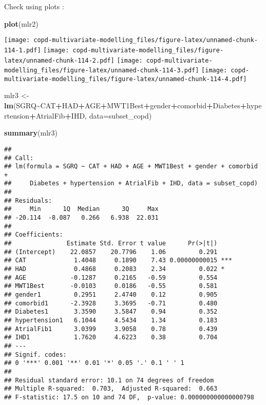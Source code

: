 \documentclass[
]{article}
\newenvironment{Shaded}{\begin{snugshade}}{\end{snugshade}}
\newcommand{\AttributeTok}[1]{\textcolor[rgb]{0.13,0.29,0.53}{#1}}
\newcommand{\FunctionTok}[1]{\textcolor[rgb]{0.13,0.29,0.53}{\textbf{#1}}}
\newcommand{\NormalTok}[1]{#1}
\newcommand{\OtherTok}[1]{\textcolor[rgb]{0.56,0.35,0.01}{#1}}
\newcommand{\SpecialCharTok}[1]{\textcolor[rgb]{0.81,0.36,0.00}{\textbf{#1}}}
\begin{document}
Check using plots :

\begin{Shaded}
\begin{Highlighting}[]
\FunctionTok{plot}\NormalTok{(mlr2)}
\end{Highlighting}
\end{Shaded}

\texttt{[image: copd-multivariate-modelling\_files/figure-latex/unnamed-chunk-114-1.pdf]}
\texttt{[image: copd-multivariate-modelling\_files/figure-latex/unnamed-chunk-114-2.pdf]}
\texttt{[image: copd-multivariate-modelling\_files/figure-latex/unnamed-chunk-114-3.pdf]}
\texttt{[image: copd-multivariate-modelling\_files/figure-latex/unnamed-chunk-114-4.pdf]}

\begin{Shaded}
\begin{Highlighting}[]
\NormalTok{mlr3 }\OtherTok{\textless{}{-}} \FunctionTok{lm}\NormalTok{(SGRQ}\SpecialCharTok{\textasciitilde{}}\NormalTok{CAT}\SpecialCharTok{+}\NormalTok{HAD}\SpecialCharTok{+}\NormalTok{AGE}\SpecialCharTok{+}\NormalTok{MWT1Best}\SpecialCharTok{+}\NormalTok{gender}\SpecialCharTok{+}\NormalTok{comorbid}\SpecialCharTok{+}\NormalTok{Diabetes}\SpecialCharTok{+}\NormalTok{hypertension}\SpecialCharTok{+}\NormalTok{AtrialFib}\SpecialCharTok{+}\NormalTok{IHD, }\AttributeTok{data=}\NormalTok{subset\_copd)}
\end{Highlighting}
\end{Shaded}

\begin{Shaded}
\begin{Highlighting}[]
\FunctionTok{summary}\NormalTok{(mlr3)}
\end{Highlighting}
\end{Shaded}

\begin{verbatim}
## 
## Call:
## lm(formula = SGRQ ~ CAT + HAD + AGE + MWT1Best + gender + comorbid + 
##     Diabetes + hypertension + AtrialFib + IHD, data = subset_copd)
## 
## Residuals:
##     Min      1Q  Median      3Q     Max 
## -20.114  -8.087   0.266   6.938  22.031 
## 
## Coefficients:
##               Estimate Std. Error t value      Pr(>|t|)    
## (Intercept)    22.0857    20.7796    1.06         0.291    
## CAT             1.4048     0.1890    7.43 0.00000000015 ***
## HAD             0.4868     0.2083    2.34         0.022 *  
## AGE            -0.1287     0.2165   -0.59         0.554    
## MWT1Best       -0.0103     0.0186   -0.55         0.581    
## gender1         0.2951     2.4740    0.12         0.905    
## comorbid1      -2.3928     3.3695   -0.71         0.480    
## Diabetes1       3.3590     3.5847    0.94         0.352    
## hypertension1   6.1044     4.5434    1.34         0.183    
## AtrialFib1      3.0399     3.9058    0.78         0.439    
## IHD1            1.7620     4.6223    0.38         0.704    
## ---
## Signif. codes:  
## 0 '***' 0.001 '**' 0.01 '*' 0.05 '.' 0.1 ' ' 1
## 
## Residual standard error: 10.1 on 74 degrees of freedom
## Multiple R-squared:  0.703,  Adjusted R-squared:  0.663 
## F-statistic: 17.5 on 10 and 74 DF,  p-value: 0.000000000000000798
\end{verbatim}
\end{document}
